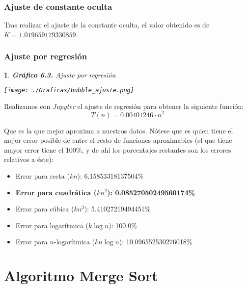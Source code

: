 \documentclass[10pt, a4paper]{article}
\theoremstyle{theorem-style}
\newtheorem*{datos}{}
\theoremstyle{theorem-style}
\theoremstyle{definition-style}
\theoremstyle{remark-style}
\theoremstyle{example-style}
\theoremstyle{definition-style}
\theoremstyle{remark-style}
\begin{document}
\subsubsection{Ajuste de constante oculta}

Tras realizar el ajuste de la constante oculta, el valor obtenido es de $K=1.019659179330859$.
\pagebreak
\subsubsection{Ajuste por regresión}

\begin{datos}
	{\bf\sffamily Gráfico 6.3.} {\sffamily Ajuste por regresión}\\
	\vspace{-0.7cm}
	\begin{center}
		\texttt{[image: ./Graficas/bubble\_ajuste.png]}
	\end{center}	
\end{datos}

Realizamos con \emph{Jupyter} el ajuste de regresión para obtener la siguiente función:
$$T(n)=0.00401246\cdot n^2$$

Que es la que mejor aproxima a nuestros datos. Nótese que es quien tiene el mejor error posible de entre el resto de funciones aproximables (el que tiene mayor error tiene el 100\%, y de ahí los porcentajes restantes son los errores relativos a éste):

\begin{itemize}
	\item Error para recta ($kn$): 6.15853318137504\%
	\item \textbf{Error para cuadrática ($kn^2$): 0.08527050249560174\%}
	\item Error para cúbica ($kn^3$): 5.41027219494451\%
	\item Error para logarítmica ($k\log n$): 100.0\%
	\item Error para $n$-logarítmica ($kn\log n$): 10.096552530276018\%
\end{itemize}
\pagebreak
\section{Algoritmo Merge Sort}
\end{document}
